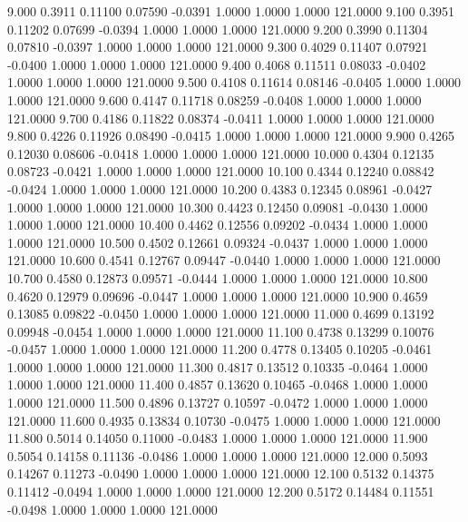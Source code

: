    9.000   0.3911   0.11100   0.07590  -0.0391   1.0000   1.0000   1.0000 121.0000
   9.100   0.3951   0.11202   0.07699  -0.0394   1.0000   1.0000   1.0000 121.0000
   9.200   0.3990   0.11304   0.07810  -0.0397   1.0000   1.0000   1.0000 121.0000
   9.300   0.4029   0.11407   0.07921  -0.0400   1.0000   1.0000   1.0000 121.0000
   9.400   0.4068   0.11511   0.08033  -0.0402   1.0000   1.0000   1.0000 121.0000
   9.500   0.4108   0.11614   0.08146  -0.0405   1.0000   1.0000   1.0000 121.0000
   9.600   0.4147   0.11718   0.08259  -0.0408   1.0000   1.0000   1.0000 121.0000
   9.700   0.4186   0.11822   0.08374  -0.0411   1.0000   1.0000   1.0000 121.0000
   9.800   0.4226   0.11926   0.08490  -0.0415   1.0000   1.0000   1.0000 121.0000
   9.900   0.4265   0.12030   0.08606  -0.0418   1.0000   1.0000   1.0000 121.0000
  10.000   0.4304   0.12135   0.08723  -0.0421   1.0000   1.0000   1.0000 121.0000
  10.100   0.4344   0.12240   0.08842  -0.0424   1.0000   1.0000   1.0000 121.0000
  10.200   0.4383   0.12345   0.08961  -0.0427   1.0000   1.0000   1.0000 121.0000
  10.300   0.4423   0.12450   0.09081  -0.0430   1.0000   1.0000   1.0000 121.0000
  10.400   0.4462   0.12556   0.09202  -0.0434   1.0000   1.0000   1.0000 121.0000
  10.500   0.4502   0.12661   0.09324  -0.0437   1.0000   1.0000   1.0000 121.0000
  10.600   0.4541   0.12767   0.09447  -0.0440   1.0000   1.0000   1.0000 121.0000
  10.700   0.4580   0.12873   0.09571  -0.0444   1.0000   1.0000   1.0000 121.0000
  10.800   0.4620   0.12979   0.09696  -0.0447   1.0000   1.0000   1.0000 121.0000
  10.900   0.4659   0.13085   0.09822  -0.0450   1.0000   1.0000   1.0000 121.0000
  11.000   0.4699   0.13192   0.09948  -0.0454   1.0000   1.0000   1.0000 121.0000
  11.100   0.4738   0.13299   0.10076  -0.0457   1.0000   1.0000   1.0000 121.0000
  11.200   0.4778   0.13405   0.10205  -0.0461   1.0000   1.0000   1.0000 121.0000
  11.300   0.4817   0.13512   0.10335  -0.0464   1.0000   1.0000   1.0000 121.0000
  11.400   0.4857   0.13620   0.10465  -0.0468   1.0000   1.0000   1.0000 121.0000
  11.500   0.4896   0.13727   0.10597  -0.0472   1.0000   1.0000   1.0000 121.0000
  11.600   0.4935   0.13834   0.10730  -0.0475   1.0000   1.0000   1.0000 121.0000
  11.800   0.5014   0.14050   0.11000  -0.0483   1.0000   1.0000   1.0000 121.0000
  11.900   0.5054   0.14158   0.11136  -0.0486   1.0000   1.0000   1.0000 121.0000
  12.000   0.5093   0.14267   0.11273  -0.0490   1.0000   1.0000   1.0000 121.0000
  12.100   0.5132   0.14375   0.11412  -0.0494   1.0000   1.0000   1.0000 121.0000
  12.200   0.5172   0.14484   0.11551  -0.0498   1.0000   1.0000   1.0000 121.0000
